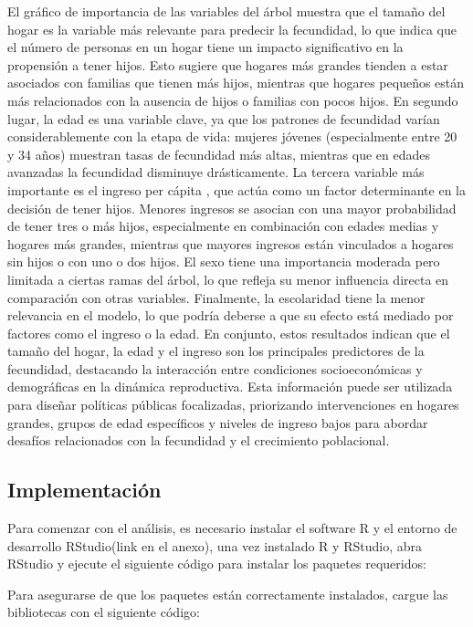 \documentclass[
]{article}
\begin{document}
El gráfico de importancia de las variables del árbol muestra que el
tamaño del hogar es la variable más relevante para predecir la
fecundidad, lo que indica que el número de personas en un hogar tiene un
impacto significativo en la propensión a tener hijos. Esto sugiere que
hogares más grandes tienden a estar asociados con familias que tienen
más hijos, mientras que hogares pequeños están más relacionados con la
ausencia de hijos o familias con pocos hijos. En segundo lugar, la edad
es una variable clave, ya que los patrones de fecundidad varían
considerablemente con la etapa de vida: mujeres jóvenes (especialmente
entre 20 y 34 años) muestran tasas de fecundidad más altas, mientras que
en edades avanzadas la fecundidad disminuye drásticamente. La tercera
variable más importante es el ingreso per cápita , que actúa como un
factor determinante en la decisión de tener hijos. Menores ingresos se
asocian con una mayor probabilidad de tener tres o más hijos,
especialmente en combinación con edades medias y hogares más grandes,
mientras que mayores ingresos están vinculados a hogares sin hijos o con
uno o dos hijos. El sexo tiene una importancia moderada pero limitada a
ciertas ramas del árbol, lo que refleja su menor influencia directa en
comparación con otras variables. Finalmente, la escolaridad tiene la
menor relevancia en el modelo, lo que podría deberse a que su efecto
está mediado por factores como el ingreso o la edad. En conjunto, estos
resultados indican que el tamaño del hogar, la edad y el ingreso son los
principales predictores de la fecundidad, destacando la interacción
entre condiciones socioeconómicas y demográficas en la dinámica
reproductiva. Esta información puede ser utilizada para diseñar
políticas públicas focalizadas, priorizando intervenciones en hogares
grandes, grupos de edad específicos y niveles de ingreso bajos para
abordar desafíos relacionados con la fecundidad y el crecimiento
poblacional.

\newpage

\subsection{Implementación}\label{implementaciuxf3n}

Para comenzar con el análisis, es necesario instalar el software R y el
entorno de desarrollo RStudio(link en el anexo), una vez instalado R y
RStudio, abra RStudio y ejecute el siguiente código para instalar los
paquetes requeridos:

Para asegurarse de que los paquetes están correctamente instalados,
cargue las bibliotecas con el siguiente código:
\end{document}
